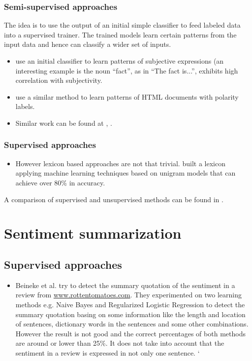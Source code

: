 \documentclass{article}
\begin{document}
        \subsubsection{Semi-supervised approaches}
          The idea is to use the output of an initial simple classifier to feed
  labeled data into a supervised trainer. The trained models learn
  certain patterns from the input data and hence can classify a wider set of
  inputs.
          \begin{itemize}
            \item \cite{Riloff2003} use an initial classifier to learn patterns
  of subjective expressions (an interesting example is the noun ``fact'', as in
  ``The fact is...'', exhibits high correlation with subjectivity.
            \item \cite{Kaji2006} use a similar method to learn patterns of HTML
  documents with polarity labels.
            \item Similar work can be found at
  \cite{Wiebea2005}, \cite{Riloff2003a}.
          \end{itemize}

        \subsubsection{Supervised approaches}
          \begin{itemize}
              \item However lexicon based approaches are not that trivial.
  \citet{Pang2002} built a lexicon applying machine learning techniques based on
  unigram models that can achieve over 80\% in accuracy.
          \end{itemize}

        A comparison of supervised and unsupervised methods can be found in
  \cite{Chaovalit2005}.

  \section{Sentiment summarization}
    \subsection{Supervised approaches}
        \begin{itemize}
            \item Beineke et al. \citet{Beineke2004} try to detect
the summary quotation of the sentiment in a review
from \url{www.rottentomatoes.com}. They experimented on two learning methods
e.g. Naive Bayes and Regularized Logistic Regression to detect the summary
quotation basing on some information like the length and location of sentences,
dictionary words in the sentences and some other combinations. However the
result is not good and the correct percentages of both methods are around or
lower than 25\%. It does not take into account that the sentiment in a review is
expressed in not only one sentence.         
  `     \end{itemize}   
\end{document}
